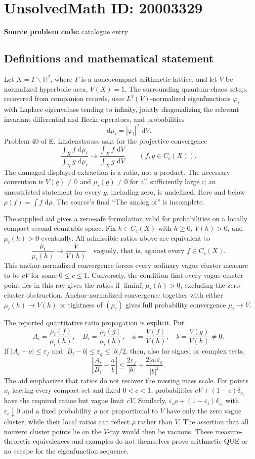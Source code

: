 \documentclass[11pt]{article}
\newcommand{\dd}{\,\mathrm{d}}
\begin{document}
\section*{UnsolvedMath ID: 20003329}
\textbf{Source problem code:} catalogue entry
\subsection{Definitions and mathematical statement}
Let $X=\Gamma\backslash\mathbb H^2$, where $\Gamma$ is a noncocompact arithmetic lattice, and let $V$ be normalized hyperbolic area, $V(X)=1$. The surrounding quantum-chaos setup, recovered from companion records, uses $L^2(V)$-normalized eigenfunctions $\varphi_i$ with Laplace eigenvalues tending to infinity, jointly diagonalizing the relevant invariant differential and Hecke operators, and probabilities
\[
 \dd\mu_i=|\varphi_i|^2\,\dd V.
\]
Problem 40 of E. Lindenstrauss asks for the projective convergence
\[
 \frac{\int_X f\,\dd\mu_i}{\int_X g\,\dd\mu_i}
 \longrightarrow
 \frac{\int_X f\,\dd V}{\int_X g\,\dd V}
 \qquad(f,g\in C_c(X)).
\]
The damaged displayed extraction is a ratio, not a product. The necessary convention is $V(g)\ne0$ and $\mu_i(g)\ne0$ for all sufficiently large $i$; an unrestricted statement for every $g$, including zero, is undefined. Here and below $\rho(f)=\int f\,\dd\rho$. The source's final ``The analog of'' is incomplete.

The supplied aid gives a zero-safe formulation valid for probabilities on a locally compact second-countable space. Fix $h\in C_c(X)$ with $h\ge0$, $V(h)>0$, and $\mu_i(h)>0$ eventually. All admissible ratios above are equivalent to
\[
 \frac{\mu_i}{\mu_i(h)}\longrightarrow\frac{V}{V(h)}
 \quad\text{vaguely, that is, against every }f\in C_c(X).
\]
This anchor-normalized convergence forces every ordinary vague cluster measure to be $cV$ for some $0\le c\le1$. Conversely, the condition that every vague cluster point lies in this ray gives the ratios if $\liminf_i\mu_i(h)>0$, excluding the zero-cluster obstruction. Anchor-normalized convergence together with either $\mu_i(h)\to V(h)$ or tightness of $(\mu_i)$ gives full probability convergence $\mu_i\to V$.

The reported quantitative ratio propagation is explicit. Put
\[
 A_i=\frac{\mu_i(f)}{\mu_i(h)},\quad B_i=\frac{\mu_i(g)}{\mu_i(h)},\quad
 a=\frac{V(f)}{V(h)},\quad b=\frac{V(g)}{V(h)}\ne0.
\]
If $|A_i-a|\le\varepsilon_f$ and $|B_i-b|\le\varepsilon_g\le|b|/2$, then, also for signed or complex tests,
\[
 \left|\frac{A_i}{B_i}-\frac ab\right|
 \le\frac{2\varepsilon_f}{|b|}
      +\frac{2|a|\varepsilon_g}{|b|^2}.
\]
The aid emphasizes that ratios do not recover the missing mass scale. For points $x_i$ leaving every compact set and fixed $0<c<1$, probabilities $cV+(1-c)\delta_{x_i}$ have the required ratios but vague limit $cV$. Similarly, $\varepsilon_i\rho+(1-\varepsilon_i)\delta_{x_i}$ with $\varepsilon_i\downarrow0$ and a fixed probability $\rho$ not proportional to $V$ have only the zero vague cluster, while their local ratios can reflect $\rho$ rather than $V$. The assertion that all nonzero cluster points lie on the $V$-ray would then be vacuous. These measure-theoretic equivalences and examples do not themselves prove arithmetic QUE or no escape for the eigenfunction sequence.
\end{document}
